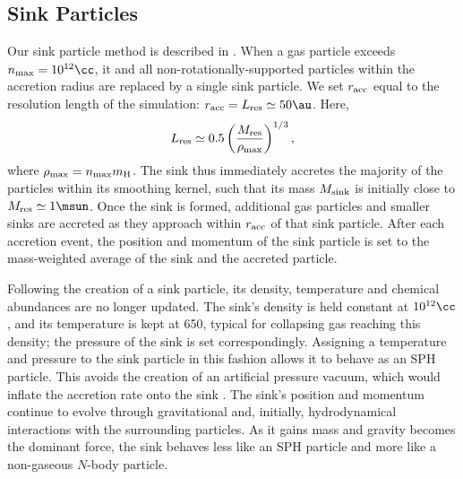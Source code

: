 \subsection{Sink Particles}
\label{sinkParticles}
Our sink particle method is described in \citet{StacyGreifBromm2010}. When a gas particle exceeds $n_{\rm max} = 10^{12}\cc$, it and all
non-rotationally-supported particles within the accretion radius are
replaced by a single sink particle.  We set $r_{\rm acc}$ equal to the resolution length of the simulation: $r_{\rm acc} = L_{\rm res} \simeq 50\au$.  Here, 
\begin{equation}
L_{\rm res} \simeq 0.5 \left( \frac{M_{\rm res}}{\rho_{\rm max}} \right)^{1/3},
\end{equation}
where $\rho_{\rm max} = n_{\rm max} m_{\rm H}$.  The sink thus immediately accretes the majority of the particles within its smoothing kernel, such that its mass $M_{\rm sink}$ is initially close to $M_{\rm res} \simeq 1\msun$. Once the sink is formed, additional gas particles and smaller sinks are accreted as they approach within $r_{\rm acc}$ of that sink particle.  After each accretion event, the position and momentum of the sink particle is set to the mass-weighted average of the sink and the accreted particle.

Following the creation of a sink particle, its density, temperature and chemical abundances are no longer updated. The sink's density is held constant at $10^{12}\cc$, and its temperature is kept at 650\kelvin, typical for collapsing gas reaching this density; the pressure of the sink is set correspondingly. Assigning a temperature and pressure to the sink particle in this fashion allows it to behave as an SPH particle. This  avoids the creation of an artificial pressure vacuum, which would inflate the accretion rate onto the sink \citep[see][]{BrommCoppiLarson2002, MartelEvansShapiro2006}. The sink's position and momentum continue to evolve through gravitational and, initially, hydrodynamical interactions with the surrounding particles. As it gains mass and gravity becomes the dominant force, the sink behaves less like an SPH particle and more like a non-gaseous $N$-body particle.